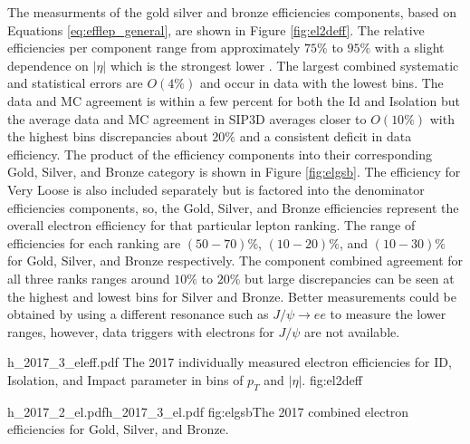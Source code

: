 The measurments of the gold silver and bronze efficiencies components, based on Equations \ref{eq:efflep_general}, are shown in Figure \ref{fig:el2deff}. The relative efficiencies per component range from approximately $75\%$ to $95\%$ with a slight dependence on $|\eta|$ which is the strongest lower \pt. The largest combined systematic and statistical errors are $O(4\%)$ and occur in data with the lowest \pt bins. The data and MC agreement is within a few percent for both the Id and Isolation but the average data and MC agreement in SIP3D averages closer to $O(10\%)$ with the highest \pt bins discrepancies about $20\%$ and a consistent deficit in data efficiency. The product of the efficiency components into their corresponding Gold, Silver, and Bronze category is shown in Figure \ref{fig:elgsb}. The efficiency for Very Loose is also included separately but is factored into the denominator efficiencies components, so, the Gold, Silver, and Bronze efficiencies represent the overall electron efficiency for that particular lepton ranking. The range of efficiencies for each ranking are $(50-70)\%$, $(10-20)\%$, and $(10-30)\%$ for Gold, Silver, and Bronze respectively. The component combined agreement for all three ranks ranges around $10\%$ to $20\%$ but large discrepancies can be seen at the highest and lowest \pt bins for Silver and Bronze. Better measurements could be obtained by using a different resonance such as $J/\psi \rightarrow ee$ to measure the lower \pt ranges, however, data triggers with electrons for $J/\psi$ are not available.

%
           {h_2017_3_eleff.pdf}%
         {The 2017 individually measured electron efficiencies for ID, Isolation, and Impact parameter in bins of $p_T$ and $|\eta|$.} {fig:el2deff}


%
           {h_2017_2_el.pdf}{h_2017_3_el.pdf}%
          {fig:elgsb}{The 2017 combined electron efficiencies for Gold, Silver, and Bronze. }

\FloatBarrier
